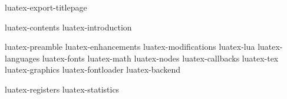 \startmode[*export]
    \component luatex-export-titlepage
\stopmode

\startfrontmatter
    \component luatex-contents
    \component luatex-introduction
\stopfrontmatter

\startbodymatter
    \component luatex-preamble
    \component luatex-enhancements
    \component luatex-modifications
    \component luatex-lua
    \component luatex-languages
    \component luatex-fonts
    \component luatex-math
    \component luatex-nodes
    \component luatex-callbacks
    \component luatex-tex
    \component luatex-graphics
    \component luatex-fontloader
    \component luatex-backend
\stopbodymatter

\startbackmatter
    \component luatex-registers
    \component luatex-statistics
\stopbackmatter

\stopdocument
